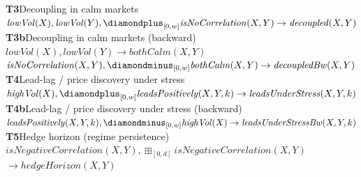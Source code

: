 \begin{figure}[t]
{\begin{minipage}{0.95\textwidth}
\textbf{T3}\quad Decoupling in calm markets~\cite{ang2002asymmetric}\hspace{1em plus 1fill}{\footnotesize (fitted constants: $w$)}\\
\hspace*{1.5em}\mbox{$\mathit{lowVol}(X), \mathit{lowVol}(Y), \diamondplus_{[0,w]} \mathit{isNoCorrelation}(X,Y) \to \mathit{decoupled}(X,Y)$}\\[5pt]
\textbf{T3b}\quad Decoupling in calm markets (backward)~\cite{ang2002asymmetric}\hspace{1em plus 1fill}{\footnotesize (fitted constants: $w$)}\\
\hspace*{1.5em}\mbox{$\mathit{lowVol}(X), \mathit{lowVol}(Y) \to \mathit{bothCalm}(X,Y)$}\\
\hspace*{1.5em}\mbox{$\mathit{isNoCorrelation}(X,Y), \diamondminus_{[0,w]} \mathit{bothCalm}(X,Y) \to \mathit{decoupledBw}(X,Y)$}\\[5pt]
\textbf{T4}\quad Lead-lag / price discovery under stress~\cite{hasbrouck1995onesecurity,dejong1997highfrequency}\hspace{1em plus 1fill}{\footnotesize (fitted constants: $w$, $k$)}\\
\hspace*{1.5em}\mbox{$\mathit{highVol}(X), \diamondplus_{[0,w]} \mathit{leadsPositively}(X,Y,k) \to \mathit{leadsUnderStress}(X,Y,k)$}\\[5pt]
\textbf{T4b}\quad Lead-lag / price discovery under stress (backward)~\cite{hasbrouck1995onesecurity,dejong1997highfrequency}\hspace{1em plus 1fill}{\footnotesize (fitted constants: $w$, $k$)}\\
\hspace*{1.5em}\mbox{$\mathit{leadsPositively}(X,Y,k), \diamondminus_{[0,w]} \mathit{highVol}(X) \to \mathit{leadsUnderStressBw}(X,Y,k)$}\\[5pt]
\textbf{T5}\quad Hedge horizon (regime persistence)~\cite{baur2010hedge}\hspace{1em plus 1fill}{\footnotesize (fitted constants: $d$)}\\
\hspace*{1.5em}\mbox{$\mathit{isNegativeCorrelation}(X,Y), \boxplus_{[0,d]} \mathit{isNegativeCorrelation}(X,Y)$}\\
\hspace*{1.5em}\hspace*{3em}\mbox{$\to \mathit{hedgeHorizon}(X,Y)$}\\[5pt]

\end{minipage}}
\end{figure}
